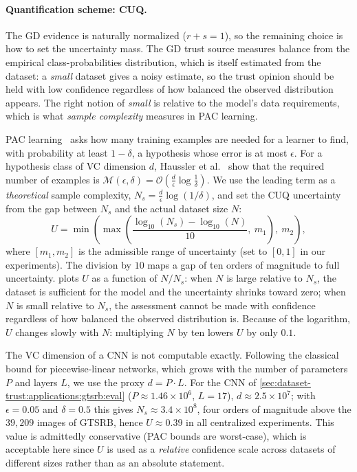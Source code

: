 \paragraph{Quantification scheme: \ac{CUQ}.}
The GD evidence is naturally normalized ($r + s = 1$), so the remaining choice is how to set the uncertainty mass. The GD trust source measures balance from the empirical class-probabilities distribution, which is itself estimated from the dataset: a \emph{small} dataset gives a noisy estimate, so the trust opinion should be held with low confidence regardless of how balanced the observed distribution appears. The right notion of \emph{small} is relative to the model's data requirements, which is what \emph{sample complexity} measures in \ac{PAC} learning.

\ac{PAC} learning~\cite{valiant1984theory} asks how many training examples are needed for a learner to find, with probability at least $1 - \delta$, a hypothesis whose error is at most $\epsilon$. For a hypothesis class of \ac{VC} dimension $d$, Haussler et al.~\cite{HAUSSLER1994248} show that the required number of examples is
$\mathcal{M}(\epsilon, \delta) = \mathcal{O}\!\left(\frac{d}{\epsilon}\log\frac{1}{\delta}\right)$.
We use the leading term as a \emph{theoretical} sample complexity,
$N_s = \frac{d}{\epsilon}\log(1/\delta)$,
and set the \ac{CUQ} uncertainty from the gap between $N_s$ and the actual dataset size $N$:
\begin{equation}
U = \min\!\left(
      \max\!\left(
        \frac{\log_{10}(N_s) - \log_{10}(N)}{10},\ m_1\right),\ m_2\right),
\label{eq:gtsrb:uncertainty}
\end{equation}
where $[m_1, m_2]$ is the admissible range of uncertainty (set to $[0,1]$ in our experiments). The division by $10$ maps a gap of ten orders of magnitude to full uncertainty.  plots $U$ as a function of $N / N_s$: when $N$ is large relative to $N_s$, the dataset is sufficient for the model and the uncertainty shrinks toward zero; when $N$ is small relative to $N_s$, the assessment cannot be made with confidence regardless of how balanced the observed distribution is. Because of the logarithm, $U$ changes slowly with $N$: multiplying $N$ by ten lowers $U$ by only $0.1$.

The \ac{VC} dimension of a \ac{CNN} is not computable exactly. Following the classical bound for piecewise-linear networks, which grows with the number of parameters $P$ and layers $L$, we use the proxy $d = P \cdot L$. For the \ac{CNN} of \cref{sec:dataset-trust:applications:gtsrb:eval} ($P \approx 1.46 \times 10^{6}$, $L = 17$), $d \approx 2.5 \times 10^{7}$; with $\epsilon = 0.05$ and $\delta = 0.5$ this gives $N_s \approx 3.4 \times 10^{8}$, four orders of magnitude above the $39{,}209$ images of \ac{GTSRB}, hence $U \approx 0.39$ in all centralized experiments. This value is admittedly conservative (\ac{PAC} bounds are worst-case), which is acceptable here since $U$ is used as a \emph{relative} confidence scale across datasets of different sizes rather than as an absolute statement.

